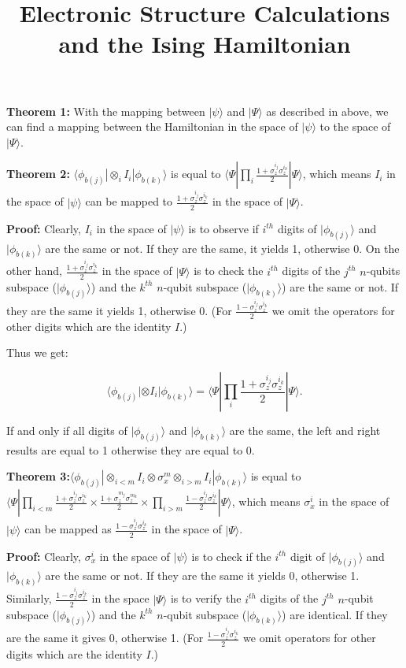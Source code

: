 \documentclass{article}
\newcommand\x[1]{\sigma_x^{#1}}
\newcommand\z[1]{\sigma_z^{#1}}\title{Electronic Structure Calculations and the Ising Hamiltonian}
\begin{document}
{\bf Theorem 1:} With the mapping between $|\psi\rangle$ and $|\Psi\rangle$ as described in above, we can find a mapping between the Hamiltonian in the space of $|\psi\rangle$ to the space of $|\Psi\rangle$.

{\bf Theorem 2:} $\langle\phi_{b(j)}|\otimes_i I_i|\phi_{b(k)}\rangle$ is equal to $\langle\Psi|\prod_i\frac{1+\z{i_j}\z{i_k}}{2}|\Psi\rangle$, which means $I_i$ in the space of $|\psi\rangle$ can be mapped to $\frac{1+\z{i_j}\z{i_k}}{2}$ in the space of $|\Psi\rangle$.

{\bf Proof:} Clearly, $I_i$ in the space of $|\psi\rangle$ is to observe if $i^{th}$ digits of $|\phi_{b(j)}\rangle$ and $|\phi_{b(k)}\rangle$ are the same or not. If they are the same, it yields 1, otherwise 0.  On the other hand, $\frac{1+\z{i_j}\z{i_k}}{2}$ in the space of $|\Psi\rangle$ is to check the $i^{th}$ digits of the  $j^{th}$ $n$-qubits subspace ($|\phi_{b(j)}\rangle$) and the $k^{th}$ $n$-qubit subspace ($|\phi_{b(k)}\rangle$) are the same or not. If they are the same it yields 1, otherwise 0. (For $\frac{1-\z{i_j}\z{i_k}}{2}$ we omit the operators for other digits which are the identity $I$.)

Thus we get:

\begin{equation}
\langle\phi_{b(j)}|\otimes I_i|\phi_{b(k)}\rangle =\langle\Psi|\prod_i\frac{1+\z{i_j}\z{i_k}}{2}|\Psi\rangle .
\end{equation}

If and only if all digits of $|\phi_{b(j)}\rangle$ and $|\phi_{b(k)}\rangle$ are the same, the left and right results are equal to 1 otherwise they are equal to 0. 

{\bf Theorem 3:}$\langle\phi_{b(j)}|\otimes_{i<m} I_i\otimes \x{m}\otimes_{i>m}I_i|\phi_{b(k)}\rangle$ is equal to $\langle\Psi|\prod_{i<m}\frac{1+\z{i_j}\z{i_k}}{2}\times\frac{1+\z{m_j}\z{m_k}}{2}\times\prod_{i>m}\frac{1-\z{i_j}\z{i_k}}{2}|\Psi\rangle$, which means $\x{i}$ in the space of $|\psi\rangle$ can be mapped as $\frac{1-\z{i_j}\z{i_k}}{2}$ in the space of $|\Psi\rangle$.

{\bf Proof:} Clearly, $\x{i}$ in the space of $|\psi\rangle$ is to check if the $i^{th}$ digit of $|\phi_{b(j)}\rangle$ and $|\phi_{b(k)}\rangle$ are the same or not. If they are the same it yields 0, otherwise 1.  Similarly, $\frac{1-\z{i_j}\z{i_k}}{2}$ in the space $|\Psi\rangle$ is to verify the $i^{th}$ digits of  the $j^{th}$ $n$-qubit subspace ($|\phi_{b(j)}\rangle$) and the $k^{th}$ $n$-qubit subspace ($|\phi_{b(k)}\rangle$) are identical. If they are the same it gives 0, otherwise 1. (For $\frac{1-\z{i_j}\z{i_k}}{2}$ we omit operators for other digits which are the identity $I$.)
\end{document}
